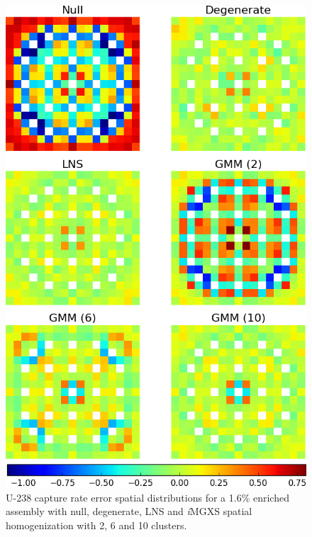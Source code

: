 \begin{figure}[h!]
\centering
\includegraphics[width=0.9\linewidth]{figures/results/spatial/assm-16/capt-err}
\vspace{2mm}
\caption[U-238 capture rate errors for a 1.6\% enriched assembly]{U-238 capture rate error spatial distributions for a 1.6\% enriched assembly with null, degenerate, \ac{LNS} and \textit{i}\ac{MGXS} spatial homogenization with 2, 6 and 10 clusters.}
\label{fig:chap11-assm-1.6-capt-rates}
\end{figure}

\clearpage

